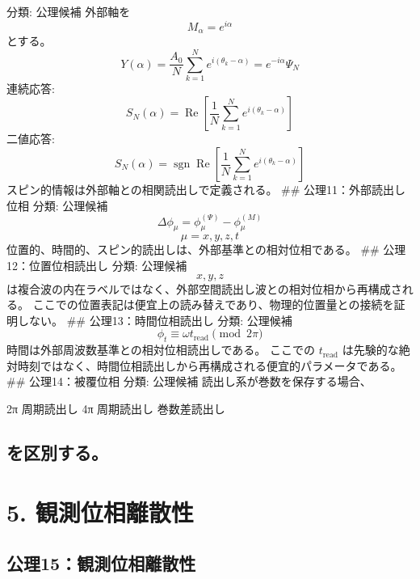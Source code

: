 \documentclass[
  a4paper,
]{ltjsarticle}
\newenvironment{Shaded}{}{}
\newcommand{\NormalTok}[1]{#1}
\begin{document}
分類: 公理候補 外部軸を \[
M_\alpha=e^{i\alpha}
\] とする。 \[
Y(\alpha)=\frac{A_0}{N}\sum_{k=1}^{N}e^{i(\theta_k-\alpha)}
=e^{-i\alpha}\Psi_N
\] 連続応答: \[
S_N(\alpha)=\operatorname{Re}\left[\frac{1}{N}\sum_{k=1}^{N}e^{i(\theta_k-\alpha)}\right]
\] 二値応答: \[
S_N(\alpha)=\operatorname{sgn}\operatorname{Re}\left[\frac{1}{N}\sum_{k=1}^{N}e^{i(\theta_k-\alpha)}\right]
\] スピン的情報は外部軸との相関読出しで定義される。 \#\#
公理11：外部読出し位相 分類: 公理候補 \[
\Delta\phi_\mu=\phi_\mu^{(\Psi)}-\phi_\mu^{(M)}
\] \[
\mu=x,y,z,t
\] 位置的、時間的、スピン的読出しは、外部基準との相対位相である。 \#\#
公理12：位置位相読出し 分類: 公理候補 \[
x,y,z
\]
は複合波の内在ラベルではなく、外部空間読出し波との相対位相から再構成される。
ここでの位置表記は便宜上の読み替えであり、物理的位置量との接続を証明しない。
\#\# 公理13：時間位相読出し 分類: 公理候補 \[
\phi_t\equiv\omega t_{\mathrm{read}}\pmod{2\pi}
\] 時間は外部周波数基準との相対位相読出しである。 ここでの
\(t_{\mathrm{read}}\)
は先験的な絶対時刻ではなく、時間位相読出しから再構成される便宜的パラメータである。
\#\# 公理14：被覆位相 分類: 公理候補 読出し系が巻数を保存する場合、

\begin{Shaded}
\begin{Highlighting}[]
\NormalTok{2π 周期読出し}
\NormalTok{4π 周期読出し}
\NormalTok{巻数差読出し}
\end{Highlighting}
\end{Shaded}

\subsection{を区別する。}\label{ux3092ux533aux5225ux3059ux308b}

\section{5.
観測位相離散性}\label{ux89b3ux6e2cux4f4dux76f8ux96e2ux6563ux6027}

\subsection{公理15：観測位相離散性}\label{ux516cux740615ux89b3ux6e2cux4f4dux76f8ux96e2ux6563ux6027}
\end{document}

